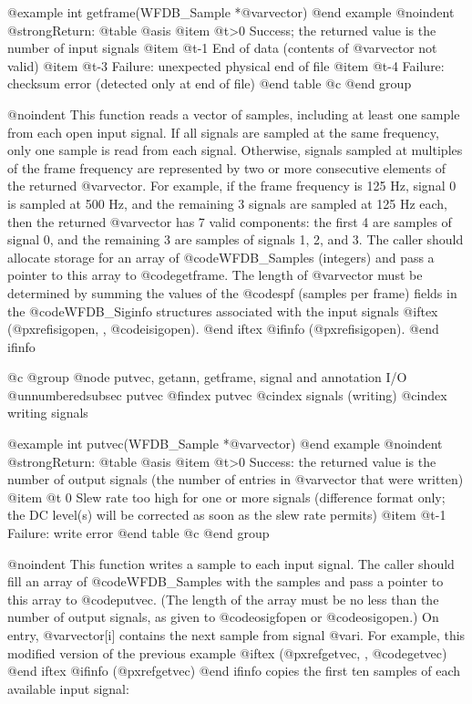 {{{{{{{{{@example
int getframe(WFDB_Sample *@var{vector})
@end example
@noindent
@strong{Return:}
@table @asis
@item @t{>0}
Success;  the returned value is the number of input signals
@item @t{-1}
End of data (contents of @var{vector} not valid)
@item @t{-3}
Failure: unexpected physical end of file
@item @t{-4}
Failure: checksum error (detected only at end of file)
@end table
@c @end group

@noindent
This function reads a vector of samples, including at least one sample from
each open input signal.  If all signals are sampled at the same frequency, only
one sample is read from each signal.  Otherwise, signals sampled at multiples
of the frame frequency are represented by two or more consecutive elements of
the returned @var{vector}.  For example, if the frame frequency is 125 Hz,
signal 0 is sampled at 500 Hz, and the remaining 3 signals are sampled at 125
Hz each, then the returned @var{vector} has 7 valid components: the first 4 are
samples of signal 0, and the remaining 3 are samples of signals 1, 2, and 3.
The caller should allocate storage for an array of @code{WFDB_Sample}s
(integers) and pass a pointer to this array to @code{getframe}.  The length of
@var{vector} must be determined by summing the values of the @code{spf}
(samples per frame) fields in the @code{WFDB_Siginfo} structures associated
with the input signals
@iftex
(@pxref{isigopen, , @code{isigopen}}).
@end iftex
@ifinfo
(@pxref{isigopen}).
@end ifinfo

@c @group
@node     putvec, getann, getframe, signal and annotation I/O
@unnumberedsubsec putvec
@findex putvec
@cindex signals (writing)
@cindex writing signals

@example
int putvec(WFDB_Sample *@var{vector})
@end example
@noindent
@strong{Return:}
@table @asis
@item @t{>0}
Success: the returned value is the number of output signals (the number
of entries in @var{vector} that were written)
@item @t{ 0}
Slew rate too high for one or more signals (difference format only; the
DC level(s) will be corrected as soon as the slew rate permits)
@item @t{-1}
Failure: write error
@end table
@c @end group

@noindent
This function writes a sample to each input signal.  The caller should fill an
array of @code{WFDB_Sample}s with the samples and pass a pointer to this array
to @code{putvec}.  (The length of the array must be no less than the number of
output signals, as given to @code{osigfopen} or @code{osigopen}.)  On entry,
@var{vector[i]} contains the next sample from signal @var{i}.  For example,
this modified version of the previous example
@iftex
(@pxref{getvec, , @code{getvec}})
@end iftex
@ifinfo
(@pxref{getvec})
@end ifinfo
copies the first ten samples of each available input signal:

}}}}}}}}}
